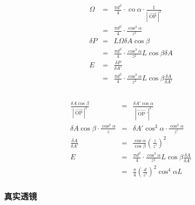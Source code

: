 \documentclass{beamer}
\newcommand{\cdummy}{\cdot}
\newcommand{\nospace}{}
\newcommand{\tmop}[1]{\ensuremath{\operatorname{#1}}}
\begin{document}
{{{{\begin{frame}
\end{frame}}{\begin{frame}
  \frametitle{}
  \begin{eqnarray*}
    \Omega & = & \frac{\pi d^2}{4} \cdummy \tmop{co} \alpha \cdummy \frac{1}{|
    \overrightarrow{\tmop{OP}} |^2}\\
    & = & \frac{\pi d^2}{4} \cdummy \frac{\cos^3 \alpha}{z^2}\\
    \delta P & = & L \Omega \delta A \nospace \cos \beta\\
    & = & \frac{\pi d^2}{4} \cdummy \frac{\cos^3 \alpha}{z^2} L \nospace \cos
    \beta \delta A \nospace\\
    E & = & \frac{\delta P}{\delta A'}\\
    & = & \frac{\pi d^2}{4} \cdummy \frac{\cos^3 \alpha}{z^2} L \nospace \cos
    \beta \frac{\delta A \nospace}{\delta A'}\\
    &  & 
  \end{eqnarray*}
\end{frame}}{\begin{frame}
  \frametitle{}
  \begin{eqnarray*}
    \frac{\delta A \nospace \cos \beta}{|  \overrightarrow{\tmop{OP}} |^2} & =
    & \frac{\delta A' \cos \alpha}{| \overrightarrow{\tmop{OP}'} |^2}\\
    \delta A \nospace \cos \beta \cdummy \frac{\cos^2 \alpha}{z} & = & \delta
    A' \cos^3 \alpha \cdummy \frac{\cos^2 \alpha}{z'}\\
    \frac{\delta A}{\delta A'} & = & \frac{\cos \alpha}{\cos \beta} \left(
    \frac{z}{z'} \right)^2\\
    E & = & \frac{\pi d^2}{4} \cdummy \frac{\cos^3 \alpha}{z^2} L \nospace
    \cos \beta \frac{\delta A \nospace}{\delta A'}\\
    & = & \frac{\pi}{4} \left( \frac{d}{{z'} } \right)^2 \nospace \cos^4
    \alpha L
  \end{eqnarray*}
\end{frame}}{\begin{frame}
  \frametitle{真实透镜}
  

\end{frame}}}}}
\end{document}
